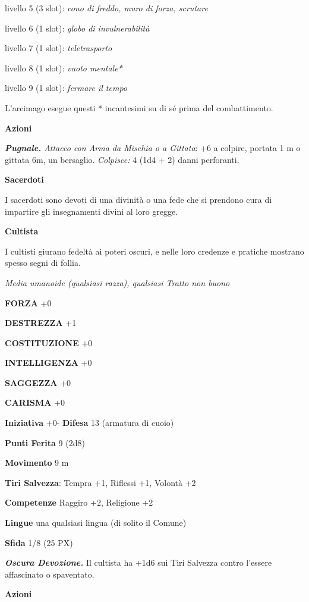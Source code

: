 \begin{multicols}{2}
	livello 5 (3 slot): \textit{cono di freddo, muro di forza, scrutare}

	livello 6 (1 slot): \textit{globo di invulnerabilità}

	livello 7 (1 slot): \textit{teletrasporto}

	livello 8 (1 slot): \textit{vuoto mentale*}

	livello 9 (1 slot): \textit{fermare il tempo}

	L'arcimago esegue questi {*} incantesimi su di sé prima del combattimento.

	\textbf{Azioni}

	\textit{\textbf{Pugnale.} Attacco con Arma da Mischia o a Gittata}: +6 a colpire, portata 1 m o gittata 6m, un bersaglio. \textit{Colpisce:} 4 (1d4 + 2) danni perforanti.


	\medskip\textbf{Sacerdoti}

	I sacerdoti sono devoti di una divinità o una fede che si prendono cura di impartire gli insegnamenti divini al loro gregge.

	\medskip\textbf{Cultista}

	I cultisti giurano fedeltà ai poteri oscuri, e nelle loro credenze e pratiche mostrano spesso segni di follia.

	\textit{Media umanoide (qualsiasi razza), qualsiasi Tratto non buono}

	\textbf{FORZA} +0

	\textbf{DESTREZZA} +1

	\textbf{COSTITUZIONE} +0

	\textbf{INTELLIGENZA} +0

	\textbf{SAGGEZZA} +0

	\textbf{CARISMA} +0

	\textbf{Iniziativa} +0- \textbf{Difesa} 13 (armatura di cuoio)

	\textbf{Punti Ferita} 9 (2d8)

	\textbf{Movimento} 9 m

	\textbf{Tiri Salvezza}: Tempra +1, Riflessi +1, Volontà +2

	\textbf{Competenze} Raggiro +2, Religione +2

	\textbf{Lingue} una qualsiasi lingua (di solito il Comune)

	\textbf{Sfida} 1/8 (25 PX)

	\textit{\textbf{Oscura Devozione.}} Il cultista ha +1d6 sui Tiri Salvezza contro l'essere affascinato o spaventato.

	\textbf{Azioni}


\end{multicols}
